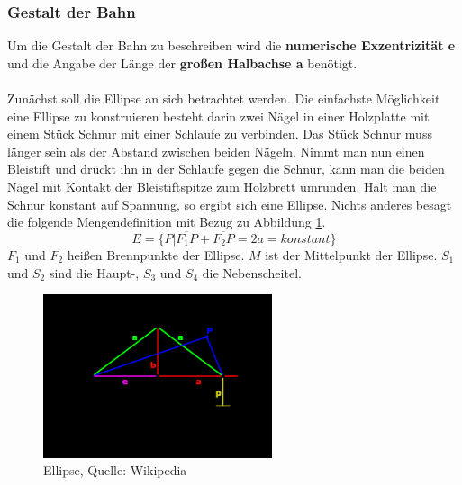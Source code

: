 \subsubsection*{Gestalt der Bahn}
Um die Gestalt der Bahn zu beschreiben wird die \textbf{numerische Exzentrizität e} und die Angabe der Länge der \textbf{großen Halbachse a} benötigt.
\\\\Zunächst soll die Ellipse an sich betrachtet werden. Die einfachste Möglichkeit eine Ellipse zu konstruieren besteht darin zwei Nägel in einer Holzplatte mit einem Stück Schnur mit einer Schlaufe zu verbinden. Das Stück Schnur muss länger sein als der Abstand zwischen beiden Nägeln. Nimmt man nun einen Bleistift und drückt ihn in der Schlaufe gegen die Schnur, kann man die beiden Nägel mit Kontakt der Bleistiftspitze zum Holzbrett umrunden. Hält man die Schnur konstant auf Spannung, so ergibt sich eine Ellipse. Nichts anderes besagt die folgende Mengendefinition mit Bezug zu Abbildung \ref{fig:ellipse}. 
\begin{equation}
E = \{P | \overline{F_{1}P} + \overline{F_{2}P} = 2a = konstant\}
\end{equation}
\ensuremath{F_{1}} und \ensuremath{F_{2}} heißen Brennpunkte der Ellipse. \ensuremath{M} ist der Mittelpunkt der Ellipse. \ensuremath{S_{1}} und \ensuremath{S_{2}} sind die Haupt-, \ensuremath{S_{3}} und \ensuremath{S_{4}} die Nebenscheitel.      
\begin{figure}[!htbp]                                                                       %
	\centering                                                                            	%
	\includegraphics[width=0.6\textwidth]{./images/ellipse.jpg}                             %
	\caption[Ellipse]{Ellipse, Quelle: Wikipedia}                                           %
	\label{fig:ellipse}                                                                     %
\end{figure}                                                                              	%
